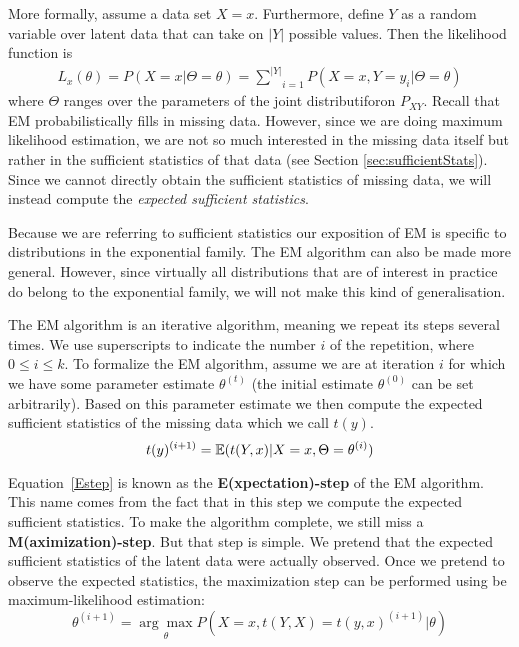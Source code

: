 More formally, assume a data set $ X=x $. Furthermore, define $ Y $ as a random variable over latent data that can
take on $ |Y| $ possible values. Then the likelihood function is 
\begin{align}
L_{x}(\theta) = P(X=x|\Theta=\theta) = \underset{i=1}{\overset{|Y|}{\sum}} P(X=x, Y=y_{i}|\Theta=\theta)
\end{align}
where $ \Theta $ ranges over the parameters of the joint distributiforon $ P_{XY} $. Recall that EM
probabilistically fills in missing data. However, since we are doing maximum likelihood estimation, we
are not so much interested in the missing data itself but rather in the sufficient statistics of
that data (see Section \ref{sec:sufficientStats}). Since we cannot directly obtain the sufficient statistics
of missing data, we will instead compute the \textit{expected sufficient statistics}.

Because we are referring to sufficient statistics our exposition of EM is specific to distributions
in the exponential family. The EM algorithm can also be made more general. However, since virtually
all distributions that are of interest in practice do belong to the exponential family, we will not make this kind of generalisation.

The EM algorithm is an iterative 
algorithm, meaning we repeat its steps several
times. We use superscripts to indicate the number $i$ of the repetition, where $ 0 \leq i \leq k $.
To formalize the EM algorithm, assume we are at iteration $i$ for which we have some parameter estimate 
$\theta^{(t)} $ (the initial estimate $\theta^{(0)}$ can be set arbitrarily). Based on this parameter 
estimate we then compute the expected sufficient statistics
of the missing data which we call $ t(y) $.
\begin{equation} \label{Estep}
t(y)^{(i+1)} = \mathbb{E}(t(Y,x)|X = x,\Theta = \theta^{(i)})
\end{equation} 

Equation~\eqref{Estep} is known as the \textbf{E(xpectation)-step} of the EM algorithm. This name
comes from the fact that in this step we compute the expected sufficient statistics. 
To make the algorithm complete, we still miss a
\textbf{M(aximization)-step}. But that step is simple. We pretend that the expected sufficient statistics of 
the latent data were actually observed. Once we pretend to observe the expected statistics, the maximization 
step can be performed using be maximum-likelihood estimation:
\begin{equation} \label{Mstep}
\theta^{(i+1)} = \underset{\theta}{\arg\max} P(X=x, t(Y,X) = t(y,x)^{(i+1)}|\theta)
\end{equation}

